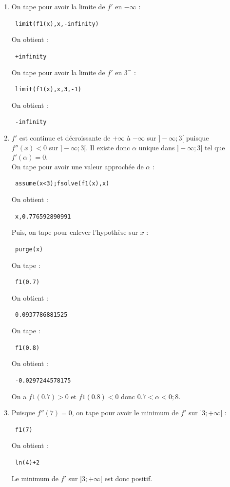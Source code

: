 \documentclass{article}
\begin{document}
\begin{enumerate}
\item 
On tape pour avoir la limite de $f'$ en $-\infty$ :
\begin{center}
\verb| limit(f1(x),x,-infinity)|
\end{center}
On obtient :
\begin{center}
\verb| +infinity|
\end{center}
On tape pour avoir la limite de $f'$ en $3^-$ :
\begin{center}
\verb| limit(f1(x),x,3,-1)|
\end{center}
On obtient :
\begin{center}
\verb| -infinity|
\end{center}
\item 
$f'$ est continue et d\'ecroissante  de $+\infty$ \`a $-\infty$ sur 
$]-\infty;3[$ puisque $f''(x)<0$ sur $]-\infty;3[$. Il existe donc $\alpha$ 
unique dans $]-\infty;3[$ tel que $f'(\alpha)=0$.\\
On tape pour avoir une valeur approch\'ee de $\alpha$ :
\begin{center}
\verb| assume(x<3);fsolve(f1(x),x)|
\end{center}
On obtient :
\begin{center}
\verb| x,0.776592890991|
\end{center}
Puis, on tape pour enlever l'hypoth\`ese sur $x$ :
\begin{center}
\verb| purge(x)|
\end{center}
On tape :
\begin{center}
\verb| f1(0.7)|
\end{center}
On obtient :
\begin{center}
\verb| 0.0937786881525|
\end{center}
On tape :
\begin{center}
\verb| f1(0.8)|
\end{center}
On obtient :
\begin{center}
\verb| -0.0297244578175|
\end{center}
On a $f1(0.7)>0$ et $f1(0.8)<0$ donc $0.7<\alpha<0;8$.
\item 
Puisque $f''(7)=0$, on tape pour avoir le minimum de $f'$ sur $]3;+\infty[$ :
\begin{center}
\verb| f1(7)|
\end{center}
On obtient :
\begin{center}
\verb| ln(4)+2|
\end{center}
Le minimum de $f'$ sur $]3;+\infty[$ est donc positif.\\

\end{enumerate}
\end{document}
